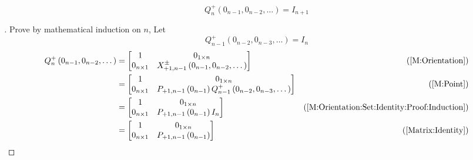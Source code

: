 \documentclass[stu, babel, american, biblatex, a4paper, leqno, draftall]{apa7}
\begin{document}
\begin{corollary}\label{M:Orientation:Set:Identity}
    \begin{equation*}
    	Q^{+}_{n}
    	\left(0_{n-1}, 0_{n-2}, \dots\right)
    	=
    	I_{n+1}
    \end{equation*}
\end{corollary}
\begin{proof}[]
    Prove by mathematical induction on $n$,
    Let 
    \begin{equation}\label{M:Orientation:Set:Identity:Proof:Induction}
        Q^+_{n-1}\left(0_{n-2}, 0_{n-3}, \dots\right)=I_n
    \end{equation}
	\begin{align*}
		Q^+_n\left(0_{n-1}, 0_{n-2}, \dots\right)
		&=
		\begin{bmatrix}
            1 & 0_{1\times n}                                                             \\
            0_{n\times 1} & X^\pm_{+1,n-1}\left(0_{n-1},0_{n-2},\dots\right) \\
        \end{bmatrix} & \text{(\cref{M:Orientation})} \\
        &=
		\begin{bmatrix}
            1 & 0_{1\times n}                                                             \\
            0_{n\times 1} & P_{+1,n-1}\left(0_{n-1}\right)Q^+_{n-1}\left(0_{n-2}, 0_{n-3}, \dots\right) \\
        \end{bmatrix} & \text{(\cref{M:Point})} \\
        &=
		\begin{bmatrix}
            1 & 0_{1\times n}                                                             \\
            0_{n\times 1} & P_{+1,n-1}\left(0_{n-1}\right) I_n \\
        \end{bmatrix} & \text{(\cref{M:Orientation:Set:Identity:Proof:Induction})} \\
        &=
		\begin{bmatrix}
            1 & 0_{1\times n}                                                             \\
            0_{n\times 1} & P_{+1,n-1}\left(0_{n-1}\right) \\
        \end{bmatrix} & \text{(\cref{Matrix:Identity})} \\

\end{align*}
\end{proof}
\end{document}
